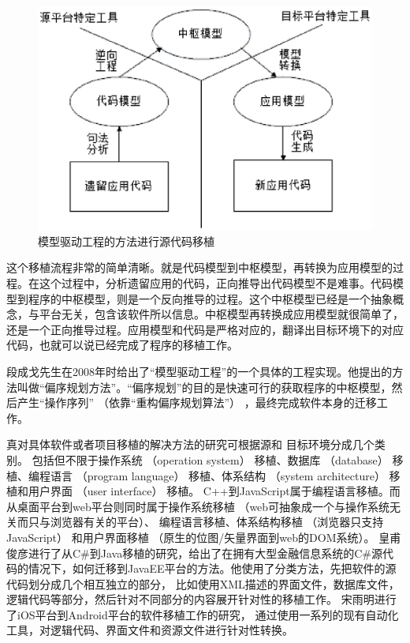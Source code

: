 \begin{figure}[h!] %
    \centering
    \includegraphics[width=250bp]{figure/pic/model-driving-software-porting.eps}
    \caption{模型驱动工程的方法进行源代码移植}
    \label{model-driving-software-porting-sample}
\end{figure}

这个移植流程非常的简单清晰。就是代码模型到中枢模型，再转换为应用模型的过程。在这个过程中，分析遗留应用的代码，正向推导出代码模型不是难事。代码模型到程序的中枢模型，则是一个反向推导的过程。这个中枢模型已经是一个抽象概念，与平台无关，包含该软件所以信息。中枢模型再转换成应用模型就很简单了，还是一个正向推导过程。应用模型和代码是严格对应的，翻译出目标环境下的对应代码，也就可以说已经完成了程序的移植工作。

段成戈先生在2008年时给出了“模型驱动工程”的一个具体的工程实现。他提出的方法叫做“偏序规划方法”。“偏序规划”的目的是快速可行的获取程序的中枢模型，然后产生“操作序列” （依靠“重构偏序规划算法”） ，最终完成软件本身的迁移工作。

真对具体软件或者项目移植的解决方法的研究可根据源和
目标环境分成几个类别。
包括但不限于操作系统 （operation system） 移植、数据库 （database） 移植、编程语言 （program language） 移植、体系结构 （system architecture） 移植和用户界面 （user interface） 移植。
C++到JavaScript属于编程语言移植。而从桌面平台到web平台则同时属于操作系统移植 （web可抽象成一个与操作系统无关而只与浏览器有关的平台）、
编程语言移植、体系结构移植 （浏览器只支持JavaScript） 和用户界面移植 （原生的位图/矢量界面到web的DOM系统）。
皇甫俊彦进行了从C\#到Java移植的研究，给出了在拥有大型金融信息系统的C\#源代码的情况下，如何迁移到JavaEE平台的方法。他使用了分类方法，先把软件的源代码划分成几个相互独立的部分，
比如使用XML描述的界面文件，数据库文件，逻辑代码等部分，然后针对不同部分的内容展开针对性的移植工作。
宋雨明进行了iOS平台到Android平台的软件移植工作的研究，
通过使用一系列的现有自动化工具，对逻辑代码、界面文件和资源文件进行针对性转换。

